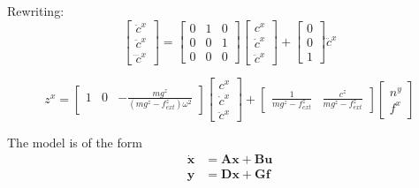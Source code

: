 Rewriting:
\begin{equation}
 \begin{bmatrix}
 \dot{c}^x \\
 \ddot{c}^x \\
 \dddot{c}^x
 \end{bmatrix}
 =
 \begin{bmatrix}
  0 & 1 & 0 \\
  0 & 0 & 1 \\
  0 & 0 & 0
 \end{bmatrix}
 \begin{bmatrix}
 c^x \\
 \dot{c}^x \\
 \ddot{c}^x
 \end{bmatrix}
 +
 \begin{bmatrix}
  0 \\
  0 \\
  1
 \end{bmatrix}
 \dddot{c}^x
\end{equation}

\begin{equation}
 z^x
 =
 \begin{bmatrix}
  1 &
  0 &
  -\frac{m g^z}{(m g^z - f^z_{ext} ) \omega^2}
 \end{bmatrix}
 \begin{bmatrix}
 c^x \\
 \dot{c}^x \\
 \ddot{c}^x
 \end{bmatrix}
 +
 \begin{bmatrix}
  \frac{1}{m g^z - f^z_{ext}} &
  \frac{c^z}{m g^z - f^z_{ext}}
 \end{bmatrix}
 \begin{bmatrix}
  n^y \\
  f^x
 \end{bmatrix}
\end{equation}

The model is of the form
\begin{align}
 \mathbf{\dot{x}} &= \mathbf{A} \mathbf{x} + \mathbf{B} \mathbf{u} \\
 \mathbf{y} &= \mathbf{D} \mathbf{x} + \mathbf{G} \mathbf{f}
\end{align}

